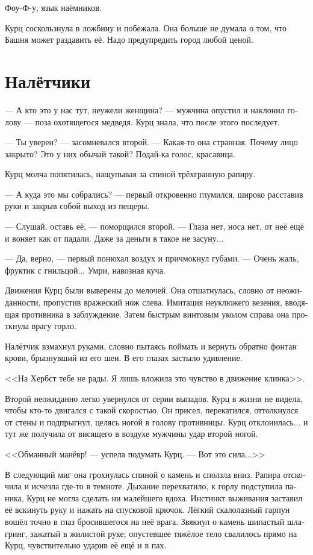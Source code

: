 \documentclass[a4paper,12pt,fleqn]{book}\usepackage{polyglossia}\setdefaultlanguage[babelshorthands=true]{russian}\setotherlanguage{english}\defaultfontfeatures{Ligatures=TeX,Mapping=tex-text}\usepackage{xcolor}\newcommand{\ml}[3]{#2}
\begin{document}
Фоу-Ф-у, язык наёмников.

Курц соскользнула в ложбину и побежала.
Она больше не думала о том, что Башня может раздавить её.
Надо предупредить город любой ценой.

\section{Налётчики}

--- А кто это у нас тут, неужели женщина? --- мужчина опустил и наклонил голову --- поза охотящегося медведя.
Курц знала, что после этого последует.

--- Ты уверен? --- засомневался второй.
--- Какая-то она странная.
Почему лицо закрыто?
Это у них обычай такой?
Подай-ка голос, красавица.

Курц молча попятилась, нащупывая за спиной трёхгранную рапиру.

--- А куда это мы собрались? --- первый откровенно глумился, широко расставив руки и закрыв собой выход из пещеры.

--- Слушай, оставь её, --- поморщился второй.
--- Глаза нет, носа нет, от неё ещё и воняет как от падали.
Даже за деньги в такое не засуну...

--- Да, верно, --- первый понюхал воздух и причмокнул губами.
--- Очень жаль, фруктик с гнильцой...
Умри, навозная куча.

Движения Курц были выверены до мелочей.
Она отшатнулась, словно от неожиданности, пропустив вражеский нож слева.
Имитация неуклюжего везения, вводящая противника в заблуждение.
Затем быстрым винтовым уколом справа она проткнула врагу горло.

Налётчик взмахнул руками, словно пытаясь поймать и вернуть обратно фонтан крови, брызнувший из его шеи.
В его глазах застыло удивление.

<<На Хербст тебе не рады.
Я лишь вложила это чувство в движение клинка>>.

Второй неожиданно легко увернулся от серии выпадов.
Курц в жизни не видела, чтобы кто-то двигался с такой скоростью.
Он присел, перекатился, оттолкнулся от стены и подпрыгнул, целясь ногой в голову противницы.
Курц отклонилась... и тут же получила от висящего в воздухе мужчины удар второй ногой.

<<Обманный манёвр! --- успела подумать Курц.
--- Вот это сила...>>

В следующий миг она грохнулась спиной о камень и сползла вниз.
Рапира отскочила и исчезла где-то в темноте.
Дыхание перехватило, к горлу подступила паника, Курц не могла сделать ни малейшего вдоха.
Инстинкт выживания заставил её вскинуть руку и нажать на спусковой крючок.
Лёгкий скалолазный гарпун вошёл точно в глаз бросившегося на неё врага.
Звякнул о камень шипастый шлагринг, зажатый в жилистой руке;
опустевшее тяжёлое тело свалилось прямо на Курц, чувствительно ударив её ещё и в пах.
\end{document}
